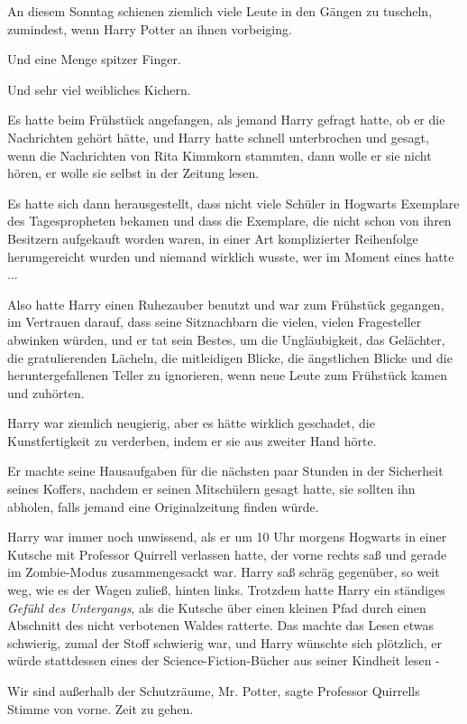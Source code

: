 An diesem Sonntag schienen ziemlich viele Leute in den Gängen zu tuscheln,
zumindest, wenn Harry Potter an ihnen vorbeiging.

Und eine Menge spitzer Finger.

Und sehr viel weibliches Kichern.

Es hatte beim Frühstück angefangen, als jemand Harry gefragt hatte, ob er die
Nachrichten gehört hätte, und Harry hatte schnell unterbrochen und gesagt, wenn
die Nachrichten von Rita Kimmkorn stammten, dann wolle er sie nicht hören, er
wolle sie selbst in der Zeitung lesen.

Es hatte sich dann herausgestellt, dass nicht viele Schüler in Hogwarts
Exemplare des Tagespropheten bekamen und dass die Exemplare, die nicht schon von
ihren Besitzern aufgekauft worden waren, in einer Art komplizierter Reihenfolge
herumgereicht wurden und niemand wirklich wusste, wer im Moment eines hatte ...

Also hatte Harry einen Ruhezauber benutzt und war zum Frühstück gegangen, im
Vertrauen darauf, dass seine Sitznachbarn die vielen, vielen Fragesteller
abwinken würden, und er tat sein Bestes, um die Ungläubigkeit, das Gelächter,
die gratulierenden Lächeln, die mitleidigen Blicke, die ängstlichen Blicke und
die heruntergefallenen Teller zu ignorieren, wenn neue Leute zum Frühstück kamen
und zuhörten.

Harry war ziemlich neugierig, aber es hätte wirklich geschadet, die
Kunstfertigkeit zu verderben, indem er sie aus zweiter Hand hörte.

Er machte seine Hausaufgaben für die nächsten paar Stunden in der Sicherheit
seines Koffers, nachdem er seinen Mitschülern gesagt hatte, sie sollten ihn
abholen, falls jemand eine Originalzeitung finden würde.

Harry war immer noch unwissend, als er um 10 Uhr morgens Hogwarts in einer
Kutsche mit Professor Quirrell verlassen hatte, der vorne rechts saß und gerade
im Zombie-Modus zusammengesackt war. Harry saß schräg gegenüber, so weit weg,
wie es der Wagen zuließ, hinten links. Trotzdem hatte Harry ein ständiges
\emph{Gefühl des Untergangs}, als die Kutsche über einen kleinen Pfad durch
einen Abschnitt des nicht verbotenen Waldes ratterte. Das machte das Lesen etwas
schwierig, zumal der Stoff schwierig war, und Harry wünschte sich plötzlich, er
würde stattdessen eines der Science-Fiction-Bücher aus seiner Kindheit lesen -

\glqq{}Wir sind außerhalb der Schutzräume, Mr. Potter\grqq{}, sagte Professor
Quirrells Stimme von vorne. \glqq{}Zeit zu gehen.\grqq{}

